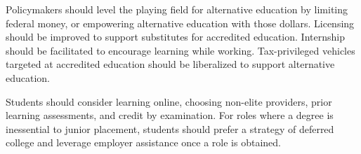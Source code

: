 \documentclass[review]{elsarticle}
\begin{document}
        Policymakers should level the playing field for alternative education by limiting federal money,
        or empowering alternative education with those dollars.
        Licensing should be improved to support substitutes for accredited education.
        Internship should be facilitated to encourage learning while working.
        Tax-privileged vehicles targeted at accredited education should be liberalized
        to support alternative education.

        Students should consider learning online, choosing non-elite providers,
        prior learning assessments, and credit by examination.
        For roles where a degree is inessential to junior placement, students should prefer a strategy of
        deferred college and leverage employer assistance once a role is obtained.
        
        
        
        
\end{document}

